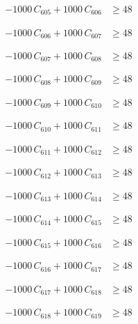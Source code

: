 \documentclass[a4paper,11pt]{article}
\begin{document}
\begin{align}
-1000\,C_{605} + 1000\,C_{606} &\geq 48 \nonumber
\end{align}

\begin{align}
-1000\,C_{606} + 1000\,C_{607} &\geq 48 \nonumber
\end{align}

\begin{align}
-1000\,C_{607} + 1000\,C_{608} &\geq 48 \nonumber
\end{align}

\begin{align}
-1000\,C_{608} + 1000\,C_{609} &\geq 48 \nonumber
\end{align}

\begin{align}
-1000\,C_{609} + 1000\,C_{610} &\geq 48 \nonumber
\end{align}

\begin{align}
-1000\,C_{610} + 1000\,C_{611} &\geq 48 \nonumber
\end{align}

\begin{align}
-1000\,C_{611} + 1000\,C_{612} &\geq 48 \nonumber
\end{align}

\begin{align}
-1000\,C_{612} + 1000\,C_{613} &\geq 48 \nonumber
\end{align}

\begin{align}
-1000\,C_{613} + 1000\,C_{614} &\geq 48 \nonumber
\end{align}

\begin{align}
-1000\,C_{614} + 1000\,C_{615} &\geq 48 \nonumber
\end{align}

\begin{align}
-1000\,C_{615} + 1000\,C_{616} &\geq 48 \nonumber
\end{align}

\begin{align}
-1000\,C_{616} + 1000\,C_{617} &\geq 48 \nonumber
\end{align}

\begin{align}
-1000\,C_{617} + 1000\,C_{618} &\geq 48 \nonumber
\end{align}

\begin{align}
-1000\,C_{618} + 1000\,C_{619} &\geq 48 \nonumber
\end{align}
\end{document}
